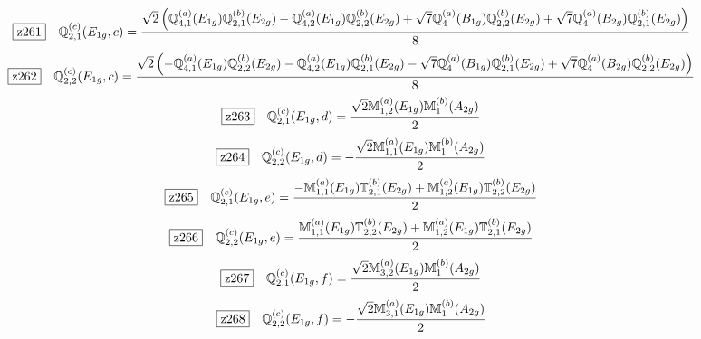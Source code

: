 \documentclass[fleqn,10pt,landscape]{jsarticle}
\begin{document}
\begin{dmath*}
\hspace*{3mm}\fbox{z261}\quad \mathbb{Q}_{2,1}^{(c)}(E_{1g},c)=\frac{\sqrt{2} \left(\mathbb{Q}_{4,1}^{(a)}(E_{1g}) \mathbb{Q}_{2,1}^{(b)}(E_{2g}) - \mathbb{Q}_{4,2}^{(a)}(E_{1g}) \mathbb{Q}_{2,2}^{(b)}(E_{2g}) + \sqrt{7} \mathbb{Q}_{4}^{(a)}(B_{1g}) \mathbb{Q}_{2,2}^{(b)}(E_{2g}) + \sqrt{7} \mathbb{Q}_{4}^{(a)}(B_{2g}) \mathbb{Q}_{2,1}^{(b)}(E_{2g})\right)}{8}
\end{dmath*}
\begin{dmath*}
\hspace*{3mm}\fbox{z262}\quad \mathbb{Q}_{2,2}^{(c)}(E_{1g},c)=\frac{\sqrt{2} \left(- \mathbb{Q}_{4,1}^{(a)}(E_{1g}) \mathbb{Q}_{2,2}^{(b)}(E_{2g}) - \mathbb{Q}_{4,2}^{(a)}(E_{1g}) \mathbb{Q}_{2,1}^{(b)}(E_{2g}) - \sqrt{7} \mathbb{Q}_{4}^{(a)}(B_{1g}) \mathbb{Q}_{2,1}^{(b)}(E_{2g}) + \sqrt{7} \mathbb{Q}_{4}^{(a)}(B_{2g}) \mathbb{Q}_{2,2}^{(b)}(E_{2g})\right)}{8}
\end{dmath*}
\begin{dmath*}
\hspace*{3mm}\fbox{z263}\quad \mathbb{Q}_{2,1}^{(c)}(E_{1g},d)=\frac{\sqrt{2} \mathbb{M}_{1,2}^{(a)}(E_{1g}) \mathbb{M}_{1}^{(b)}(A_{2g})}{2}
\end{dmath*}
\begin{dmath*}
\hspace*{3mm}\fbox{z264}\quad \mathbb{Q}_{2,2}^{(c)}(E_{1g},d)=- \frac{\sqrt{2} \mathbb{M}_{1,1}^{(a)}(E_{1g}) \mathbb{M}_{1}^{(b)}(A_{2g})}{2}
\end{dmath*}
\begin{dmath*}
\hspace*{3mm}\fbox{z265}\quad \mathbb{Q}_{2,1}^{(c)}(E_{1g},e)=\frac{- \mathbb{M}_{1,1}^{(a)}(E_{1g}) \mathbb{T}_{2,1}^{(b)}(E_{2g}) + \mathbb{M}_{1,2}^{(a)}(E_{1g}) \mathbb{T}_{2,2}^{(b)}(E_{2g})}{2}
\end{dmath*}
\begin{dmath*}
\hspace*{3mm}\fbox{z266}\quad \mathbb{Q}_{2,2}^{(c)}(E_{1g},e)=\frac{\mathbb{M}_{1,1}^{(a)}(E_{1g}) \mathbb{T}_{2,2}^{(b)}(E_{2g}) + \mathbb{M}_{1,2}^{(a)}(E_{1g}) \mathbb{T}_{2,1}^{(b)}(E_{2g})}{2}
\end{dmath*}
\begin{dmath*}
\hspace*{3mm}\fbox{z267}\quad \mathbb{Q}_{2,1}^{(c)}(E_{1g},f)=\frac{\sqrt{2} \mathbb{M}_{3,2}^{(a)}(E_{1g}) \mathbb{M}_{1}^{(b)}(A_{2g})}{2}
\end{dmath*}
\begin{dmath*}
\hspace*{3mm}\fbox{z268}\quad \mathbb{Q}_{2,2}^{(c)}(E_{1g},f)=- \frac{\sqrt{2} \mathbb{M}_{3,1}^{(a)}(E_{1g}) \mathbb{M}_{1}^{(b)}(A_{2g})}{2}
\end{dmath*}
\end{document}
